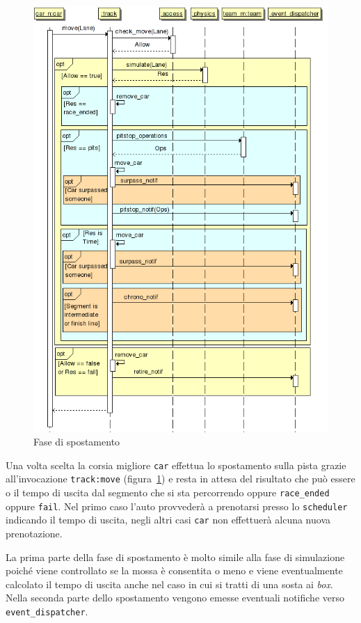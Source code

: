 \documentclass[a4paper]{report}
\newcommand{\fun}[1]{\texttt{#1}}
\begin{document}
\begin{figure}
\includegraphics[width=\textwidth]{diagrammi/Move}
\caption{Fase di spostamento}
\label{fig:move}
\end{figure}

Una volta scelta la corsia migliore \texttt{car} effettua lo spostamento sulla pista grazie all'invocazione \fun{track:move} (figura~\ref{fig:move}) e resta in attesa del risultato che può essere o il tempo di uscita dal segmento che si sta percorrendo oppure \texttt{race\_ended} oppure \texttt{fail}. Nel primo caso l'auto provvederà a prenotarsi presso lo \texttt{scheduler} indicando il tempo di uscita, negli altri casi \texttt{car} non effettuerà alcuna nuova prenotazione.

La prima parte della fase di spostamento è molto simile alla fase di simulazione poiché viene controllato se la mossa è consentita o meno e viene eventualmente calcolato il tempo di uscita anche nel caso in cui si tratti di una sosta ai \textit{box}. Nella seconda parte dello spostamento vengono emesse eventuali notifiche verso \texttt{event\_dispatcher}.
\end{document}
